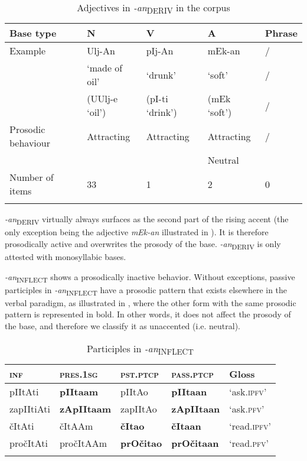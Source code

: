 \documentclass[output=paper]{langsci/langscibook}
\begin{document}
\begin{table}
\caption{Adjectives in \textit{-an}\textsubscript{DERIV} in the corpus}
\label{tab5}
\begin{tabular}{l l l l l}
\lsptoprule  
 Base type & N & V & A & Phrase
\\ %
\midrule
Example  &  Ulj-An & pIj-An & mEk-an  & /   \\
   & `made of oil' & `drunk' & `soft' & /  \\
& (UUlj-e `oil') & (pI-ti `drink') & (mEk `soft') & /	\smallskip\\ 
Prosodic behaviour & Attracting & Attracting & Attracting & / \\ 
& & & Neutral \smallskip& \\
Number of items & 33 & 1 & 2 & 0 \\
 \lspbottomrule
 \end{tabular}
\end{table}

\textit{-an}\textsubscript{DERIV} virtually always surfaces as the second part of the rising accent (the only exception being the adjective \textit{mEk-an} illustrated in ). It is therefore prosodically active and overwrites the prosody of the base. \textit{-an}\textsubscript{DERIV} is only attested with monosyllabic bases.

\textit{-an}\textsubscript{INFLECT} shows a prosodically inactive behavior. Without exceptions, passive participles in \textit{-an}\textsubscript{INFLECT} have a prosodic pattern that exists elsewhere in the verbal paradigm, as illustrated in , where the other form with the same prosodic pattern is represented in bold. In other words, it does not affect the prosody of the base, and therefore we classify it as unaccented (i.e. neutral).

\begin{table}
\caption{Participles in \textit{-an}\textsubscript{INFLECT}}
\label{tab6}
 \begin{tabular}{ l l l l l}
\lsptoprule  
\textsc{inf}&\textsc{pres.1sg}&\textsc{pst.ptcp}&\textsc{pass.ptcp}& Gloss\\ 
\midrule
pIItAti&\textbf{pIItaam}&pIItAo&\textbf{pIItaan}&	`ask.\textsc{ipfv}' \\
zapIItiAti&\textbf{zApIItaam}&zapIItAo&\textbf{zApIItaan}&`ask.\textsc{pfv}'\\
čItAti&čItAAm&\textbf{čItao}&\textbf{čItaan}&`read.\textsc{ipfv}'\\
pročItAti&pročItAAm&\textbf{prOčitao}&\textbf{prOčitaan}&`read.\textsc{pfv}'\\
 \lspbottomrule
 \end{tabular}
\end{table}
\end{document}
